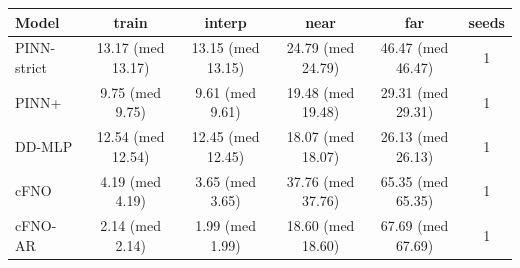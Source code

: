 \begin{tabular}{lccccc}
\toprule
Model & train & interp & near & far & seeds \\
\midrule
PINN-strict & 13.17 (med 13.17) & 13.15 (med 13.15) & 24.79 (med 24.79) & 46.47 (med 46.47) & 1 \\
PINN+ & 9.75 (med 9.75) & 9.61 (med 9.61) & 19.48 (med 19.48) & 29.31 (med 29.31) & 1 \\
DD-MLP & 12.54 (med 12.54) & 12.45 (med 12.45) & 18.07 (med 18.07) & 26.13 (med 26.13) & 1 \\
cFNO & 4.19 (med 4.19) & 3.65 (med 3.65) & 37.76 (med 37.76) & 65.35 (med 65.35) & 1 \\
cFNO-AR & 2.14 (med 2.14) & 1.99 (med 1.99) & 18.60 (med 18.60) & 67.69 (med 67.69) & 1 \\
\bottomrule
\end{tabular}
